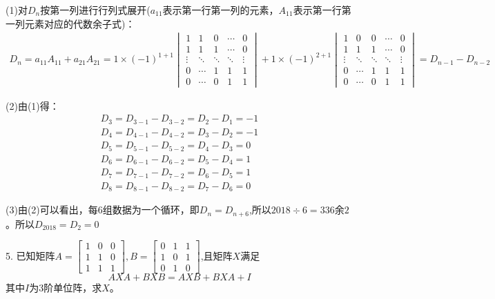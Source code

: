 \documentclass{article}
\begin{document}
\begin{jie}
(1)对$D_{n}$按第一列进行行列式展开($a_{11}$表示第一行第一列的元素，$A_{11}$表示第一行第一列元素对应的代数余子式)：
\begin{align*}
D_{n}=a_{11}A_{11}+a_{21}A_{21}=1\times(-1)^{1+1}
\begin{vmatrix}
   1 & 1 & 0 & \cdots & 0\\
   1 & 1 & 1 & \cdots & 0\\
   \vdots &\ddots & \ddots &\ddots &\vdots\\
  0 &\cdots  & 1 & 1& 1\\
  0 &\cdots & 0  & 1& 1
\end{vmatrix}+1\times(-1)^{2+1}
\begin{vmatrix}
   1 & 0 & 0 & \cdots & 0\\
   1 & 1 & 1 & \cdots & 0\\
  \vdots &\ddots & \ddots &\ddots &\vdots\\
  0 &\cdots  & 1 & 1& 1\\
  0 &\cdots  & 0 & 1& 1
\end{vmatrix}=D_{n-1}-D_{n-2}
\end{align*}

(2)由(1)得：
\begin{gather*}
D_{3}=D_{3-1}-D_{3-2}=D_{2}-D_{1}=-1\\
D_{4}=D_{4-1}-D_{4-2}=D_{3}-D_{2}=-1\\
D_{5}=D_{5-1}-D_{5-2}=D_{4}-D_{3}=0\\
D_{6}=D_{6-1}-D_{6-2}=D_{5}-D_{4}=1\\
D_{7}=D_{7-1}-D_{7-2}=D_{6}-D_{5}=1\\
D_{8}=D_{8-1}-D_{8-2}=D_{7}-D_{6}=0
\end{gather*}

(3)由(2)可以看出，每6组数据为一个循环，即$D_{n}=D_{n+6}$,所以$2018\div6=336$余$2$。所以$D_{2018}=D_{2}=0$
\end{jie}

5. 已知矩阵$A=
\begin{bmatrix}
  1 &  0 & 0\\
  1 & 1 & 0\\
   1 & 1 & 1
\end{bmatrix},B=
\begin{bmatrix}
  0 & 1 & 1\\
  1 & 0 & 1 \\
  0 & 1 & 0
\end{bmatrix}
$,且矩阵$X$满足
\begin{equation*}
  AXA+BXB=AXB+BXA+I
\end{equation*}
其中$I$为3阶单位阵，求$X$。
\end{document}
